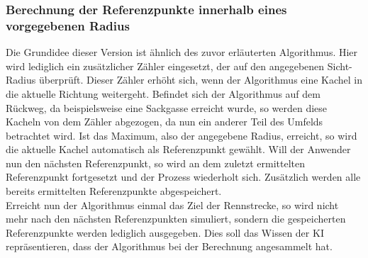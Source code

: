 \subsubsection{Berechnung der Referenzpunkte innerhalb eines vorgegebenen Radius}
Die Grundidee dieser Version ist ähnlich des zuvor erläuterten Algorithmus. Hier wird lediglich ein zusätzlicher Zähler eingesetzt, der auf den angegebenen Sicht-Radius überprüft. Dieser Zähler erhöht sich, wenn der Algorithmus eine Kachel in die aktuelle Richtung weitergeht. Befindet sich der Algorithmus auf dem Rückweg, da beispielsweise eine Sackgasse erreicht wurde, so werden diese Kacheln von dem Zähler abgezogen, da nun ein anderer Teil des Umfelds betrachtet wird. Ist das Maximum, also der angegebene Radius, erreicht, so wird die aktuelle Kachel automatisch als Referenzpunkt gewählt. Will der Anwender nun den nächsten Referenzpunkt, so wird an dem zuletzt ermittelten Referenzpunkt fortgesetzt und der Prozess wiederholt sich. Zusätzlich werden alle bereits ermittelten Referenzpunkte abgespeichert.\\
Erreicht nun der Algorithmus einmal das Ziel der Rennstrecke, so wird nicht mehr nach den nächsten Referenzpunkten simuliert, sondern die gespeicherten Referenzpunkte werden lediglich ausgegeben. Dies soll das Wissen der KI repräsentieren, dass der Algorithmus bei der Berechnung angesammelt hat.
